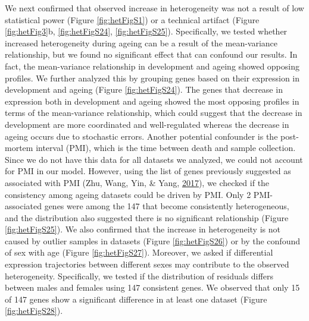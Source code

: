 \documentclass[12pt,twoside]{unicam}
\begin{document}
We next confirmed that observed increase in heterogeneity was not a result of low statistical power (Figure \ref{fig:hetFigS1}) or a technical artifact (Figure \ref{fig:hetFig3}b, \ref{fig:hetFigS24}, \ref{fig:hetFigS25}). Specifically, we tested whether increased heterogeneity during ageing can be a result of the mean-variance relationship, but we found no significant effect that can confound our results. In fact, the mean-variance relationship in development and ageing showed opposing profiles. We further analyzed this by grouping genes based on their expression in development and ageing (Figure \ref{fig:hetFigS24}). The genes that decrease in expression both in development and ageing showed the most opposing profiles in terms of the mean-variance relationship, which could suggest that the decrease in development are more coordinated and well-regulated whereas the decrease in ageing occurs due to stochastic errors. Another potential confounder is the post-mortem interval (PMI), which is the time between death and sample collection. Since we do not have this data for all datasets we analyzed, we could not account for PMI in our model. However, using the list of genes previously suggested as associated with PMI (Zhu, Wang, Yin, \& Yang, \protect\hyperlink{ref-Zhu2017}{2017}), we checked if the consistency among ageing datasets could be driven by PMI. Only 2 PMI-associated genes were among the 147 that become consistently heterogeneous, and the distribution also suggested there is no significant relationship (Figure \ref{fig:hetFigS25}). We also confirmed that the increase in heterogeneity is not caused by outlier samples in datasets (Figure \ref{fig:hetFigS26}) or by the confound of sex with age (Figure \ref{fig:hetFigS27}). Moreover, we asked if differential expression trajectories between different sexes may contribute to the observed heterogeneity. Specifically, we tested if the distribution of residuals differs between males and females using 147 consistent genes. We observed that only 15 of 147 genes show a significant difference in at least one dataset (Figure \ref{fig:hetFigS28}).
\end{document}
